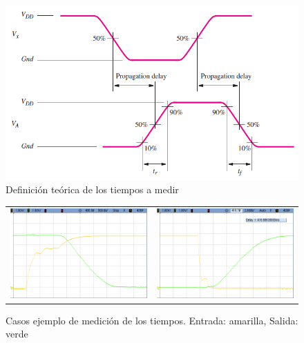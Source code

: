 \begin{figure}[H]
    \centering
        \includegraphics[scale=0.6]{../EJ1/Recursos/time_logic.PNG}
    \caption{Definici\'on te\'orica de los tiempos a medir}
    \label{fig:time_logic}
\end{figure}

\begin{figure}[H]
    \centering
        \begin{tabular}{c c}
            \includegraphics[scale=0.20]{../EJ1/Mediciones/Osciloscopio/Segundo_Intento/Times_RTL/cropped_scope_37.png} &
            \includegraphics[scale=0.20]{../EJ1/Mediciones/Osciloscopio/Segundo_Intento/Times_RTL/cropped_scope_39.png}
        \end{tabular}
    \caption{Casos ejemplo de medici\'on de los tiempos. Entrada: amarilla, Salida: verde}
    \label{fig:operation_times}
\end{figure}

